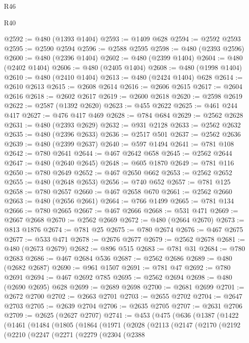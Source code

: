 \begin{lexlean}{R46}
\begin{lexlean}{R40}
\begin{coremodule}
{{{{{{{{{{{{{{{{{{{{{{{{{{{{{{{{{{{{{{{{{{{{{{{{{{{{{{{{{{{{{{{{{{{{{{{{{{{{{{{{{{{{{{{{{{{{{{{{{{{{{{{{{{{{{@2592 := @480 (@1393 @1404)
@2593 := @1409 @628
@2594 := @2592 @2593
@2595 := @2590 @2594
@2596 := @2588 @2595
@2598 := @480 (@2393 @2596)
@2600 := @480 (@2396 @1404)
@2602 := @480 (@2399 @1404)
@2604 := @480 (@2402 @1404)
@2606 := @480 (@2405 @1404)
@2608 := @480 (@1998 @1404)
@2610 := @480 (@2410 @1404)
@2613 := @480 (@2424 @1404) @628
@2614 := @2610 @2613
@2615 := @2608 @2614
@2616 := @2606 @2615
@2617 := @2604 @2616
@2618 := @2602 @2617
@2619 := @2600 @2618
@2620 := @2598 @2619
@2622 := @2587 (@1392 @2620)
@2623 := @455 @2622
@2625 := @461 @244 @417
@2627 := @476 @417 @469
@2628 := @784 @684
@2629 := @2562 @2628
@2631 := @480 (@2393 @2629)
@2632 := @931 @2128
@2633 := @2562 @2632
@2635 := @480 (@2396 @2633)
@2636 := @2517 @501
@2637 := @2562 @2636
@2639 := @480 (@2399 @2637)
@2640 := @597 @1494
@2641 := @781 @108
@2642 := @780 @2641
@2644 := @467 @2642 @658
@2645 := @2562 @2644
@2647 := @480 (@2640 @2645)
@2648 := @605 @1870
@2649 := @781 @116
@2650 := @780 @2649
@2652 := @467 @2650 @662
@2653 := @2562 @2652
@2655 := @480 (@2648 @2653)
@2656 := @740 @652
@2657 := @781 @125
@2658 := @780 @2657
@2660 := @467 @2658 @670
@2661 := @2562 @2660
@2663 := @480 (@2656 @2661)
@2664 := @766 @1499
@2665 := @781 @134
@2666 := @780 @2665
@2667 := @467 @2666
@2668 := @531 @471
@2669 := @2667 @2668
@2670 := @2562 @2669
@2672 := @480 (@2664 @2670)
@2673 := @813 @1876
@2674 := @781 @25
@2675 := @780 @2674
@2676 := @467 @2675
@2677 := @533 @471
@2678 := @2676 @2677
@2679 := @2562 @2678
@2681 := @480 (@2673 @2679)
@2682 := @896 @515
@2683 := @781 @31
@2684 := @780 @2683
@2686 := @467 @2684 @536
@2687 := @2562 @2686
@2689 := @480 (@2682 @2687)
@2690 := @961 @1507
@2691 := @781 @47
@2692 := @780 @2691
@2694 := @467 @2692 @785
@2695 := @2562 @2694
@2698 := @480 (@2690 @2695) @628
@2699 := @2689 @2698
@2700 := @2681 @2699
@2701 := @2672 @2700
@2702 := @2663 @2701
@2703 := @2655 @2702
@2704 := @2647 @2703
@2705 := @2639 @2704
@2706 := @2635 @2705
@2707 := @2631 @2706
@2709 := @2625 (@2627 @2707)
@2741 := @453
    (@475
      (@636
        (@1387
          (@1422
            (@1461
              (@1484
                (@1805
                  (@1864
                    (@1971
                      (@2028
                        (@2113
                          (@2147
                            (@2170
                              (@2192
                                (@2210
                                  (@2247
                                    (@2271
                                      (@2279
                                        (@2304
                                          (@2388
}}}}}}}}}}}}}}}}}}}}}}}}}}}}}}}}}}}}}}}}}}}}}}}}}}}}}}}}}}}}}}}}}}}}}}}}}}}}}}}}}}}}}}}}}}}}}}}}}}}}}}}}}}}}}
\end{coremodule}
\end{lexlean}
\end{lexlean}
